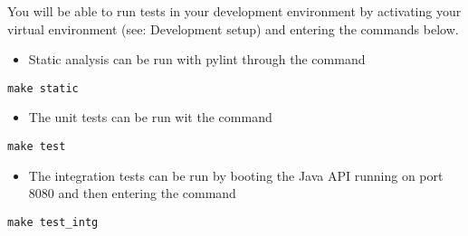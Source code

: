 You will be able to run tests in your development environment by
activating your virtual environment (see: Development setup) and
entering the commands below.

\begin{itemize}
\tightlist
\item
  Static analysis can be run with pylint through the command
\end{itemize}

\begin{verbatim}
make static
\end{verbatim}

\begin{itemize}
\tightlist
\item
  The unit tests can be run wit the command
\end{itemize}

\begin{verbatim}
make test
\end{verbatim}

\begin{itemize}
\tightlist
\item
  The integration tests can be run by booting the Java API running on
  port 8080 and then entering the command
\end{itemize}

\begin{verbatim}
make test_intg
\end{verbatim}
